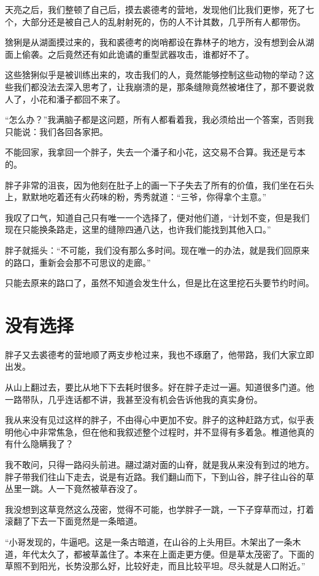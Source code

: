 天亮之后，我们整顿了自己后，摸去裘德考的营地，发现他们比我们更惨，死了七个，大部分还是被自己人的乱射射死的，伤的人不计其数，几乎所有人都带伤。

猞猁是从湖面摸过来的，我和裘德考的岗哨都设在靠林子的地方，没有想到会从湖面上偷袭。之后竟然还有如此诡谲的重型武器攻击，谁都好不了。

这些猞猁似乎是被训练出来的，攻击我们的人，竟然能够控制这些动物的举动？这些我们都没法去深入思考了，让我崩溃的是，那条缝隙竟然被堵住了，那不要说救人了，小花和潘子都回不来了。

“怎么办？”我满脑子都是这问题，所有人都看着我，我必须给出一个答案，否则我只能说：我们各回各家把。

不能回家，我拿回一个胖子，失去一个潘子和小花，这交易不合算。我还是亏本的。

胖子非常的沮丧，因为他刻在肚子上的画一下子失去了所有的价值，我们坐在石头上，默默地吃着还有火药味的粉，秀秀就道：“三爷，你得拿个主意。”

我叹了口气，知道自己只有唯一一个选择了，便对他们道，“计划不变，但是我们现在只能换条路走，这里的缝隙四通八达，也许我们能找到其他入口。”

胖子就摇头：“不可能，我们没有那么多时间。现在唯一的办法，就是我们回原来的路口，重新会会那不可思议的走廊。”

只能去原来的路口了，虽然不知道会发生什么，但是比在这里挖石头要节约时间。

\chapter{没有选择}

胖子又去裘德考的营地顺了两支步枪过来，我也不琢磨了，他带路，我们大家立即出发。

从山上翻过去，要比从地下下去耗时很多。好在胖子走过一遍。知道很多门道。他一路带队，几乎连话都不讲，我甚至没有机会告诉他我的真实身份。

我从来没有见过这样的胖子，不由得心中更加不安。胖子的这种赶路方式，似乎表明他心中非常焦急，但在他和我叙述整个过程时，并不显得有多着急。椎道他真的有什么隐瞒我了？

我不敢问，只得一路闷头前进。翮过湖对面的山脊，就是我从来没有到过的地方。胖子带我们往山下走去，说是有近路。我们翻山而下，下到山谷，胖子往山谷的草丛里一跳。人一下竟然被草吞没了。

我没想到这草竞然这么茂密，觉得不可能，也学胖子一跳，一下子穿草而过，打着滚翻了下去一下面竞然是一条暗道。

“小哥发现的，牛逼吧。这是一条古暗道，在山谷的上头用巨。木架出了一条木道，年代太久了，都被草盖住了。本来在上面走更方便。但是草太茂密了。下面的草照不到阳光，长势没那么好，比较好走，而且比较平坦。尽头就是人口附近。”

